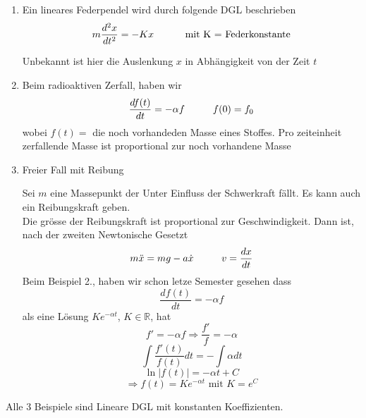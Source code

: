 \begin{enumerate}
\item Ein lineares Federpendel wird durch folgende DGL beschrieben \[m\frac{d^2x}{dt^2}=-Kx\text{\hspace{10mm} mit K = Federkonstante}\]
\begin{center}
\end{center}
Unbekannt ist hier die Auslenkung $x$ in Abhängigkeit von der Zeit $t$
\item Beim radioaktiven Zerfall, haben wir \[\frac{df(t)}{dt}=-\alpha f\text{\hspace{10mm}}f(0)=f_0\]
wobei $f(t)=$ die noch vorhandeden Masse eines Stoffes. Pro zeiteinheit zerfallende Masse ist proportional zur noch vorhandene Masse
\item Freier Fall mit Reibung
\begin{center}
\end{center}
Sei $m$ eine Massepunkt der Unter Einfluss der Schwerkraft fällt. Es kann auch ein Reibungskraft geben. \\

Die grösse der Reibungskraft ist proportional zur Geschwindigkeit. Dann ist, nach der zweiten Newtonische Gesetzt \[m\ddot x = mg - a\dot x\text{\hspace{10mm}}v=\frac{dx}{dt}\]
Beim Beispiel 2., haben wir schon letze Semester gesehen dass \[\frac{df(t)}{dt}=-\alpha f\] als eine Lösung $Ke^{-\alpha t}$, $K\in\mathbb{R}$, hat 
\[f'=-\alpha f\Rightarrow \frac{f'}{f}=-\alpha\]
\[\int{\frac{f'(t)}{f(t)}dt}=-\int{\alpha dt}\]
\[\ln\left| f(t)\right|=-\alpha t+C\]
\[\Rightarrow f(t)=Ke^{-\alpha t}\text{ mit }K={e^C}\]
\end{enumerate}
Alle 3 Beispiele sind Lineare DGL mit konstanten Koeffizienten. 
